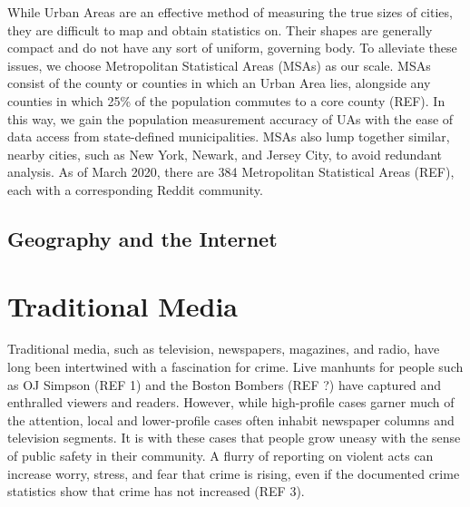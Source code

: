 \documentclass[12pt,oneside, letterpaper]{book}
\begin{document}
\par While Urban Areas are an effective method of measuring the true sizes of cities, they are difficult to map and obtain statistics on. Their shapes are generally compact and do not have any sort of uniform, governing body. To alleviate these issues, we choose Metropolitan Statistical Areas (MSAs) as our scale. MSAs consist of the county or counties in which an Urban Area lies, alongside any counties in which 25\% of the population commutes to a core county (REF). In this way, we gain the population measurement accuracy of UAs with the ease of data access from state-defined municipalities. MSAs also lump together similar, nearby cities, such as New York, Newark, and Jersey City, to avoid redundant analysis. As of March 2020, there are 384 Metropolitan Statistical Areas (REF), each with a corresponding Reddit community.

\subsection{Geography and the Internet}


\section{Traditional Media}


\par Traditional media, such as television, newspapers, magazines, and radio, have long been intertwined with a fascination for crime. Live manhunts for people such as OJ Simpson (REF 1) and the Boston Bombers (REF ?) have captured and enthralled viewers and readers. However, while high-profile cases garner much of the attention, local and lower-profile cases often inhabit newspaper columns and television segments. It is with these cases that people grow uneasy with the sense of public safety in their community. A flurry of reporting on violent acts can increase worry, stress, and fear that crime is rising, even if the documented crime statistics show that crime has not increased (REF 3).
\end{document}
